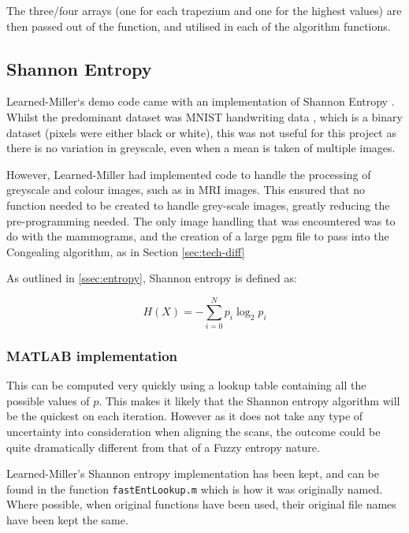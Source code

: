 The three/four arrays (one for each trapezium and one for the highest values) are then passed out of the function, and utilised in each of the algorithm functions.


\subsection{Shannon Entropy}
\label{ssec:shannon-entropy}

Learned-Miller`s demo code came with an implementation of Shannon Entropy \cite{joint-alignment}. Whilst the predominant dataset was MNIST handwriting data \cite{lecun1998gradientbased}, which is a binary dataset (pixels were either black or white), this was not useful for this project as there is no variation in greyscale, even when a mean is taken of multiple images.

However, Learned-Miller had implemented code to handle the processing of greyscale and colour images, such as in MRI images. This ensured that no function needed to be created to handle grey-scale images, greatly reducing the pre-programming needed. The only image handling that was encountered was to do with the mammograms, and the creation of a large pgm file to pass into the \Gls{Congealing} algorithm, as in Section \ref{sec:tech-diff}

As outlined in \ref{ssec:entropy}, Shannon entropy is defined as:

\begin{equation}
  H(X) = - \displaystyle\sum_{i=0}^{N}{p_i \log_2 p_i}
\end{equation}

\subsubsection{MATLAB implementation}

This can be computed very quickly using a lookup table containing all the possible values of $p$. This makes it likely that the Shannon entropy algorithm will be the quickest on each iteration. However as it does not take any type of uncertainty into consideration when aligning the scans, the outcome could be quite dramatically different from that of a Fuzzy entropy nature.

Learned-Miller's Shannon entropy implementation has been kept, and can be found in the function \texttt{fastEntLookup.m} which is how it was originally named. Where possible, when original functions have been used, their original file names have been kept the same.

